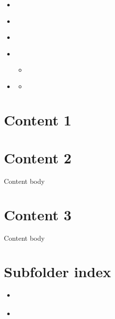 

\pagestyle{empty}
\sphinxmaketitle
\pagestyle{plain}
\sphinxtableofcontents
\pagestyle{normal}
\label{\detokenize{index::doc}}

\begin{itemize}
\item{}{\hyperref[\detokenize{content1::doc}]{}}

\item{}{\hyperref[\detokenize{content2::doc}]{}}

\item{}{\hyperref[\detokenize{content3::doc}]{}}

\item{} 

\item{}{\hyperref[\detokenize{subfolder/index::doc}]{}}

\begin{itemize}
\item{}{\hyperref[\detokenize{subfolder/asubpage::doc}]{}}

\item{} 

\end{itemize}
\end{itemize}


\chapter{Content 1}
\label{\detokenize{content1:content-1}}\label{\detokenize{content1::doc}}

\chapter{Content 2}
\label{\detokenize{content2:content-2}}\label{\detokenize{content2::doc}}
Content body


\chapter{Content 3}
\label{\detokenize{content3:content-3}}\label{\detokenize{content3::doc}}
Content body


\chapter{Subfolder index}
\label{\detokenize{subfolder/index:subfolder-index}}\label{\detokenize{subfolder/index::doc}}\begin{itemize}
\item{}{\hyperref[\detokenize{subfolder/asubpage::doc}]{}}

\item{} 

\end{itemize}


